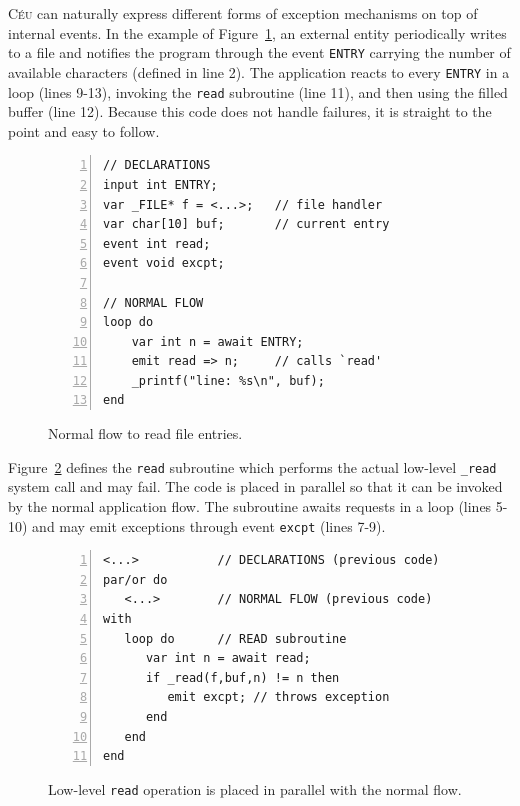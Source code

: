 \documentclass{acm_proc_article-sp}
\newcommand{\CEU}{\textsc{C\'{e}u}\xspace}
\newcommand{\code}[1] {{\small{\texttt{#1}}}}
\newcommand{\1}{\;}
\newcommand{\2}{\;\;}
\newcommand{\3}{\;\;\;}
\newcommand{\5}{\;\;\;\;\;}
\begin{document}
\CEU can naturally express different forms of exception mechanisms on top of 
internal events.
%
In the example of Figure~\ref{lst.excpt1}, an external entity periodically 
writes to a file and notifies the program through the event \code{ENTRY} 
carrying the number of available characters (defined in line 2).
The application reacts to every \code{ENTRY} in a loop (lines 9-13), invoking 
the \code{read} subroutine (line 11), and then using the filled buffer (line 
12).
Because this code does not handle failures, it is straight to the point and 
easy to follow.

\begin{figure}[t]
\begin{lstlisting}[numbers=left,xleftmargin=2em]
// DECLARATIONS
input int ENTRY;
var _FILE* f = <...>;   // file handler
var char[10] buf;       // current entry
event int read;
event void excpt;

// NORMAL FLOW
loop do
    var int n = await ENTRY;
    emit read => n;     // calls `read'
    _printf("line: %s\n", buf);
end
\end{lstlisting}
\caption{ Normal flow to read file entries.
\label{lst.excpt1}
}
\end{figure}

Figure~\ref{lst.excpt2} defines the \code{read} subroutine which performs the 
actual low-level \code{\_read} system call and may fail.
The code is placed in parallel so that it can be invoked by the normal 
application flow.
The subroutine awaits requests in a loop (lines 5-10) and may emit
exceptions through event \code{excpt} (lines 7-9).

\begin{figure}[t]
\begin{lstlisting}[numbers=left,xleftmargin=2em]
<...>           // DECLARATIONS (previous code)
par/or do
   <...>        // NORMAL FLOW (previous code)
with
   loop do      // READ subroutine
      var int n = await read;
      if _read(f,buf,n) != n then
         emit excpt; // throws exception
      end
   end
end
\end{lstlisting}
\caption{ Low-level \code{read} operation is placed in parallel with the normal 
flow.
\label{lst.excpt2}
}
\end{figure}
\end{document}
